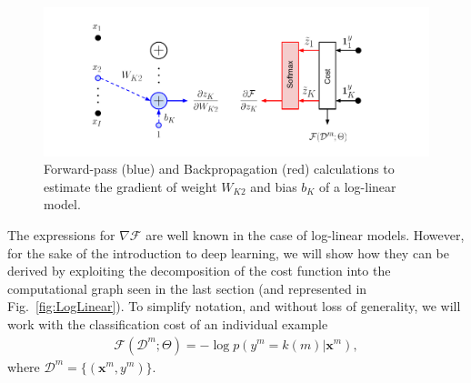 \begin{figure}[!h]
\centering
\includegraphics[scale=0.6]{figs/deep_learning/LogLin_color.pdf}
\caption{Forward-pass (blue) and Backpropagation (red) calculations to estimate the gradient of weight $W_{K2}$ and bias $b_K$ of a log-linear model.}
\label{fig:LogLinColor}
\end{figure}

The expressions for $\nabla\mathcal{F}$ are well known in the case of
log-linear models. However, for the sake of the introduction to deep learning,
we will show how they can be derived by exploiting the decomposition of the
cost function into the computational graph seen in the last section (and
represented in Fig.~\ref{fig:LogLinear}). To simplify notation, and without
loss of generality, we will work with the classification cost of an individual
example
%
\begin{align}
\mathcal{F}(\mathcal{D}^m;\Theta) = -\log p(y^m=k(m) | \mathbf{x}^m),
\label{eq:CostLogPosExample}
\end{align}
%
where $\mathcal{D}^m=\{(\mathbf{x}^m, y^m)\}$.

